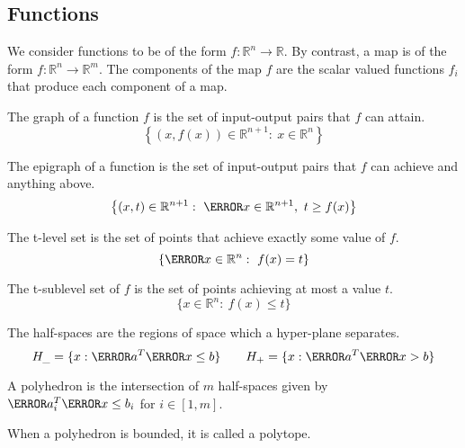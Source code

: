 \subsection{Functions}
We consider functions to be of the form $f:\mathbb{R}^n\rightarrow\mathbb{R}$.
By contrast, a map is of the form $f:\mathbb{R}^n\rightarrow\mathbb{R}^m$.
The components of the map $f$ are the scalar valued functions $f_i$ that produce each component of a map.
\begin{definition}
  The graph of a function $f$ is the set of input-output pairs that $f$ can attain.
  \[
	\left\{ (x, f(x))\in \mathbb{R}^{n+1}:\ x\in\mathbb{R}^n \right\}
  \]
  \label{defn:graph}
\end{definition}
\begin{definition}
  The epigraph of a function is the set of input-output pairs that $f$ can achieve and anything above.
  \[
	\left\{ (x,t) \in \mathbb{R}^{n+1}:\ \V{x}\in\mathbb{R}^{n+1},\ t\geq f(x) \right\}
  \]
  \label{defn:epigraph}
\end{definition}
\begin{definition}
  The t-level set is the set of points that achieve exactly some value of $f$.
  \[
	\{ \V{x}\in\mathbb{R}^n:\ f(x)=t \}
  \]
  \label{defn:level-set}
\end{definition}
\begin{definition}
  The t-sublevel set of $f$ is the set of points achieving at most a value $t$.
  \[
	\{ x\in\mathbb{R}^n:\ f(x)\leq t \}
  \]
  \label{defn:sublevel-set}
\end{definition}
\begin{definition}
  The half-spaces are the regions of space which a hyper-plane separates.
  \[
	H_{\_} = \{ x: \V{a}^T\V{x}\leq b \} \qquad H_{+} = \{ x: \V{a}^T\V{x} > b \}
  \]
  \label{defn:halfspace}
\end{definition}
\begin{definition}
	A polyhedron is the intersection of $m$ half-spaces given by $\V{a}_i^T\V{x}\leq b_i$ for $i\in[1,m]$.
	\label{defn:polyhedron}
\end{definition}
When a polyhedron is bounded, it is called a polytope.
